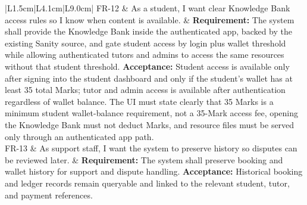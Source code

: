 \documentclass[11pt,a4paper]{article}
\begin{document}
\begin{longtable}{|L{1.5cm}|L{4.1cm}|L{9.0cm}|}
	FR-12           & As a student, I want clear Knowledge Bank access rules so I know when content is available.                                           & \textbf{Requirement:} The system shall provide the Knowledge Bank inside the authenticated app, backed by the existing Sanity source, and gate student access by login plus wallet threshold while allowing authenticated tutors and admins to access the same resources without that student threshold. \newline \textbf{Acceptance:} Student access is available only after signing into the student dashboard and only if the student's wallet has at least 35 total Marks; tutor and admin access is available after authentication regardless of wallet balance. The UI must state clearly that 35 Marks is a minimum student wallet-balance requirement, not a 35-Mark access fee, opening the Knowledge Bank must not deduct Marks, and resource files must be served only through an authenticated app path.                                                                                                                                                                                                                                                                                                                                                                 \\
	\hline
	FR-13           & As support staff, I want the system to preserve history so disputes can be reviewed later.                             & \textbf{Requirement:} The system shall preserve booking and wallet history for support and dispute handling. \newline \textbf{Acceptance:} Historical booking and ledger records remain queryable and linked to the relevant student, tutor, and payment references.                                                                                                                                                                                                                                                                                                                                             \\
	\hline

\end{longtable}
\end{document}

